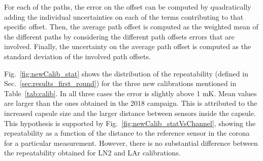 For each of the paths, the error on the offset can be computed by quadratically adding the individual uncertainties on each of the terms contributing to that specific offset. Then, the average path offset is computed as the weighted mean of the different paths by considering the different path offsets errors that are involved. Finally, the uncertainty on the average path offset is computed as the standard deviation of the involved path offsets.

Fig.~\ref{fig:newCalib_stat} shows the distribution of the repeatability (defined in Sec.~\ref{sec:results_first_round}) for the three new calibrations mentioned in Table~\ref{tab:calib}. In all three cases the error is slightly above 1 mK. Mean values are larger than the ones obtained in the 2018 campaign. This is attributed to the increased capsule size and the larger distance between sensors inside the capsule. This hypothesis is supported by Fig.~\ref{fig:newCalib_statVsChannel}, showing the repeatability as a function of the distance to the reference sensor in the corona for a particular measurement. However, there is no substantial difference between the repeatability obtained for LN2 and LAr calibrations.



